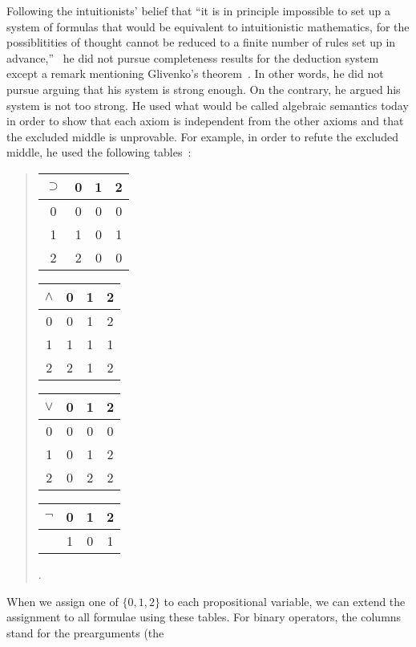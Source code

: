 Following the intuitionists' belief
that ``it is in principle impossible to set up a system of formulas that
would be equivalent to intuitionistic mathematics, for the
possiblitities of thought cannot be reduced to a finite number of rules
set up in advance,''~\citep{heyting1930} he did not pursue completeness
results for the deduction system
except a remark mentioning Glivenko's
theorem~\citep{glivenko0,glivenko1}.
In other words, he did not pursue arguing that his system is strong
enough.
On the contrary, he argued his system is not too strong.
He used what would be called algebraic semantics today
in order to show that
each axiom is independent from the other axioms and that
the excluded middle is unprovable.
For example, in order to refute the excluded middle, he used the
following tables~\citep{heyting1930}:\\
 \begin{quotation}
 \begin{center}
  \begin{tabular}{c|ccc}
   $\supset $& 0  & 1  & 2 \\ \hline
   0 & 0 & 0 & 0 \\
   1 & 1 & 0 & 1 \\
   2 & 2 & 0 & 0
  \end{tabular}
  \hfill
  \begin{tabular}{c|ccc}
   $\wedge $& 0 & 1& 2\\ \hline
   0 & 0 & 1 & 2\\
   1 & 1 & 1 & 1\\
   2 & 2 & 1 & 2\\
  \end{tabular}
  \hfill
  \begin{tabular}{c|ccc}
   $\vee$& 0 & 1 & 2\\ \hline
   0 & 0 & 0 & 0 \\
   1 & 0 & 1 & 2 \\
   2 & 0 & 2 & 2\\
  \end{tabular}
  \hfill
  \begin{tabular}{c|ccc}
   $\neg $& 0 & 1 & 2\\ \hline
   & 1 & 0 & 1\\
  \end{tabular}\enspace.
 \end{center}
 \end{quotation}
When we assign one of $\{0,1,2\}$ to each propositional variable, we
can extend the assignment to all formulae using these tables.
For binary operators, the columns stand for the prearguments (the
